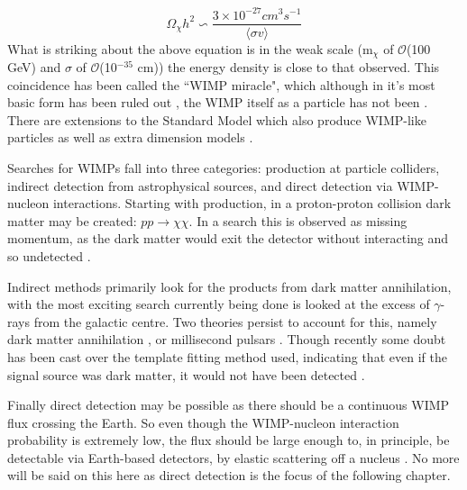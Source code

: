 \begin{equation}
    \Omega_\chi h^2 \backsim \frac{3\times 10^{-27} cm^3s^{-1}}{ \langle \sigma v \rangle}
\end{equation}
What is striking about the above equation is in the weak scale (m$_\chi$ of $\mathcal{O}$(100 GeV) and $\sigma$ of $\mathcal{O}$(10$^{-35}$ cm)) the energy density is close to that observed.
This coincidence has been called the ``WIMP miracle", which although in it's most basic form has been ruled out \cite{less_of_a_wimp_miracle_ref}, the WIMP itself as a particle has not been \cite{wimp_theory_ref}.
There are extensions to the Standard Model which also produce WIMP-like particles \cite{supersymetry_wimpy_boi_ref,supersymetry_wimpy_again_ref} as well as extra dimension models \cite{extradimention_wimps_ref}.

\par
Searches for WIMPs fall into three categories: production at particle colliders, indirect detection from astrophysical sources, and direct detection via WIMP-nucleon interactions.
Starting with production, in a proton-proton collision dark matter may be created: $pp\xrightarrow{}\chi\chi$.
In a search this is observed as missing momentum, as the dark matter would exit the detector without interacting and so undetected \cite{lhc_darkmatter_ref}.
\par
Indirect methods primarily look for the products from dark matter annihilation, with the most exciting search currently being done is looked at the excess of $\gamma$-rays from the galactic centre.
Two theories persist to account for this, namely dark matter annihilation \cite{galactic_gamma_excess_1_ref, galactic_gamma_excess_2_ref}, or millisecond pulsars \cite{galactic_gamma_excess_3_ref, galactic_gamma_excess_4_ref}.
Though recently some doubt has been cast over the template fitting method used, indicating that even if the signal source was dark matter, it would not have been detected \cite{galactic_gamma_excess_5_ref}.
\par
Finally direct detection may be possible as there should be a continuous WIMP flux crossing the Earth.
So even though the WIMP-nucleon interaction probability is extremely low, the flux should be large enough to, in principle, be detectable via Earth-based detectors, by elastic scattering off a nucleus \cite{wimp_nucleon_interactions_first_suggestion_ref,supersymmetric_dark_matter_ref}.
No more will be said on this here as direct detection is the focus of the following chapter.

